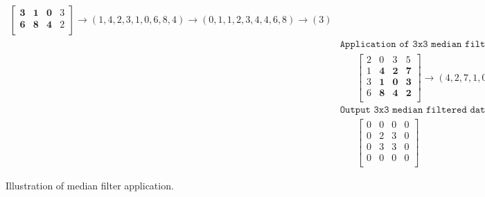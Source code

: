 \documentclass[11pt,fleqn]{article}
\begin{document}
\begin{figure}[!ht]
\begin{mdframed}
\begin{equation*}
\begin{aligned}
\begin{bmatrix}
\mathbf{3} & \mathbf{1} & \mathbf{0} & 3 \\
\mathbf{6} & \mathbf{8} & \mathbf{4} & 2 \\ 
\end{bmatrix} 
\rightarrow (1, 4, 2, 3, 1, 0, 6, 8, 4) \rightarrow (0, 1, 1, 2, 3, 4, 4, 6, 8) \rightarrow (3) \\[10pt]
%
& \texttt{Application of 3x3 median filter to the $(3,3)$ interior filter location}\\
& \hspace{20pt} \begin{bmatrix}
2 & 0 & 3 & 5 \\
1 & \mathbf{4} & \mathbf{2} & \mathbf{7} \\
3 & \mathbf{1} & \mathbf{0} & \mathbf{3} \\
6 & \mathbf{8} & \mathbf{4} & \mathbf{2} \\ 
\end{bmatrix} 
\rightarrow (4, 2, 7, 1, 0, 3, 8, 4, 2) \rightarrow (0, 1, 2, 2, 3, 4, 4, 7, 8) \rightarrow (3) \\[10pt]
%
& \texttt{Output 3x3 median filtered data, with edge locations zeroed}\\
& \hspace{20pt} \begin{bmatrix}
0 & 0 & 0 & 0 \\
0 & 2 & 3 & 0 \\
0 & 3 & 3 & 0 \\
0 & 0 & 0 & 0 \\ 
\end{bmatrix}
\end{aligned}
\end{equation*}
\caption[Illustration of median filter application]{Illustration of median filter application.}
\label{fig:median_illustrate}
\end{mdframed}
\end{figure}
\end{document}
